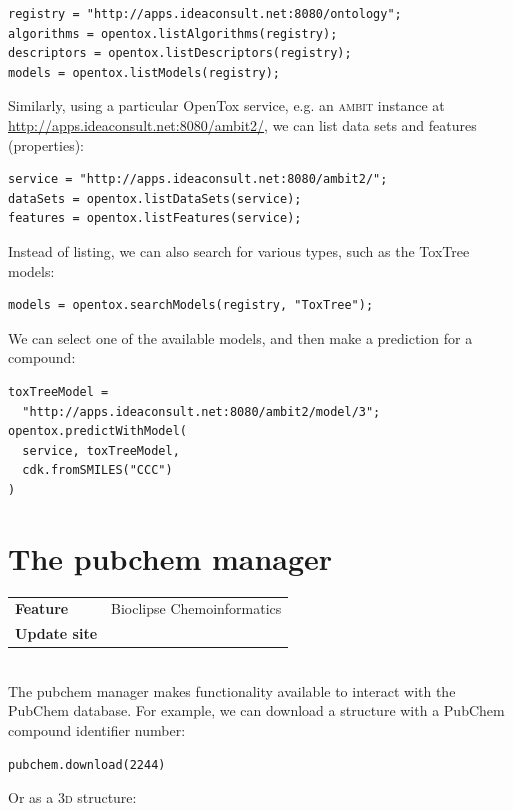 \documentclass[a5paper, 10pt]{memoir}
\begin{document}
\begin{refsection}
\begin{Verbatim}
registry = "http://apps.ideaconsult.net:8080/ontology";
algorithms = opentox.listAlgorithms(registry);
descriptors = opentox.listDescriptors(registry);
models = opentox.listModels(registry);
\end{Verbatim}
Similarly, using a particular OpenTox service, e.g. an
\textsc{ambit} instance at
\url{http://apps.ideaconsult.net:8080/ambit2/}\cite{jeliazkova2011ambit}, we
can list data sets and features
(properties):

\begin{Verbatim}
service = "http://apps.ideaconsult.net:8080/ambit2/";
dataSets = opentox.listDataSets(service);
features = opentox.listFeatures(service);
\end{Verbatim}
Instead of listing, we can also search for various types, such as the ToxTree
models\cite{patlewicz2008evaluation}:

\begin{Verbatim}
models = opentox.searchModels(registry, "ToxTree");
\end{Verbatim}
We can select one of the available models, and then make a prediction for a
compound:
\begin{Verbatim}
toxTreeModel =
  "http://apps.ideaconsult.net:8080/ambit2/model/3";
opentox.predictWithModel(
  service, toxTreeModel,
  cdk.fromSMILES("CCC")
)
\end{Verbatim}

\section{The pubchem manager}

\begin{tabular}{ll}
\textbf{Feature} & Bioclipse Chemoinformatics \\
\textbf{Update site} & \url{} \\
\end{tabular} \\

\noindent
The pubchem manager makes functionality available to interact with the PubChem
database. For example, we can download a structure with a
PubChem compound identifier number:

\begin{Verbatim}
pubchem.download(2244)
\end{Verbatim}
Or as a 3\textsc{d} structure:


\end{refsection}
\end{document}
